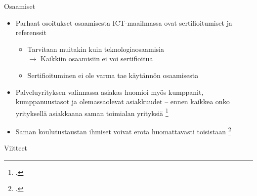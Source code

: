 \documentclass[first=purple,second=dblue,logo=redquo]{aaltoslides}
\begin{document}
\begin{frame}{Osaamiset}
\begin{itemize}
\item Parhaat osoitukset osaamisesta ICT-maailmassa ovat sertifioitumiset ja referenssit
\begin{itemize}
\item Tarvitaan muitakin kuin teknologiaosaamisia \\ $\rightarrow$ Kaikkiin osaamisiin ei voi sertifioitua
\item Sertifioituminen ei ole varma tae käytännön osaamisesta
\end{itemize}
\item Palveluyrityksen valinnassa asiakas huomioi myös kumppanit, kumppanuustasot ja olemassaolevat asiakkuudet -- ennen kaikkea onko yrityksellä asiakkaana saman toimialan yrityksiä \footcite{ICT-haasteet}
\item Saman koulutustaustan ihmiset voivat erota huomattavasti toisistaan \footcite{self-assessment_in_skill_measurement}
\end{itemize}
\end{frame}

\begin{frame}{Viitteet}
\printbibliography
\end{frame}
\end{document}
